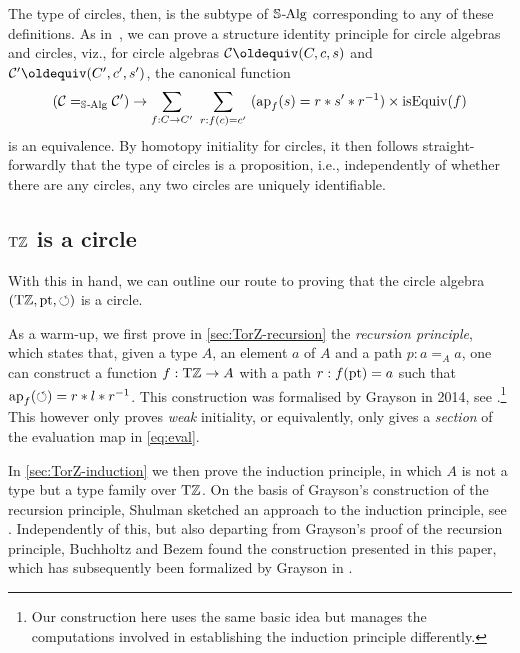 \documentclass[a4paper,12pt]{amsart}
\begin{document}
The type of circles, then, is the subtype of $\mathord{\mathbb{S}\textup{\kern.5pt-\kern-.5pt}\mathrm{Alg}}$
corresponding to any of these definitions.
As in~\cite[Sec.~9.8]{hottbook},
we can prove a structure identity principle for circle algebras and circles,
viz., for circle algebras $\mathcal C\jdeq(C,c,s)$ and
$\mathcal C'\jdeq(C',c',s')$, the canonical function
\[
  (\mathcal C =_{\mathord{\mathbb{S}\textup{\kern.5pt-\kern-.5pt}\mathrm{Alg}}} \mathcal C')
  \to
  \sum_{f : C \to C'}~\sum_{r:f(c)=c'}~(\mathop{{\mathrm{ap}}_{f}}(s)=r * s' * r^{-1})
  \times \mathrm{isEquiv}(f)
\]
is an equivalence.
By homotopy initiality for circles,
it then follows straight-forwardly that the type of circles
is a proposition, i.e.,
independently of whether there are any circles,
any two circles are uniquely identifiable.

\subsection{${\mathrm{T}\mathbb{Z}}$ is a circle}\label{sec:TorZ-circle}

With this in hand, we can outline our route to proving
that the circle algebra $({\mathrm{T}\mathbb{Z}},{\mathord{\mathrm{pt}}},{\circlearrowleft})$ is a circle.

As a warm-up, we first prove in \cref{sec:TorZ-recursion}
the \emph{recursion principle},
which states that, given a type $A$, an element $a$ of $A$ and a
path $p:a=_A a$, one can construct a function $f:{\mathrm{T}\mathbb{Z}}\to A$
with a path $r:f({\mathord{\mathrm{pt}}})=a$ such that $\mathop{{\mathrm{ap}}_{f}}({\circlearrowleft})=r * l * r^{-1}$.
This construction was formalised by Grayson
in 2014, see \cite[\href{https://github.com/UniMath/UniMath/blob/master/UniMath/SyntheticHomotopyTheory/Circle.v}{Circle.v}]{UniMath}.\footnote{Our construction here uses the
same basic idea but manages the computations involved in establishing the
induction principle differently.}
This however only proves \emph{weak} initiality, or equivalently,
only gives a \emph{section} of the evaluation map in \eqref{eq:eval}.

In \cref{sec:TorZ-induction} we then prove the induction principle,
in which $A$ is not a type but a type family over ${\mathrm{T}\mathbb{Z}}$.
On the basis of Grayson's construction of the recursion principle,
Shulman sketched an approach to the induction principle, see \cite{circleind-Mike}.
Independently of this, but also departing from Grayson's proof of the
recursion principle, Buchholtz and Bezem found the construction
presented in this paper, which has subsequently been formalized
by Grayson \cite[\href{https://github.com/UniMath/UniMath/blob/d5e570/UniMath/SyntheticHomotopyTheory/Circle2.v\#L268}{Circle2.v, line 268}]{UniMath} in \UniMath.
\end{document}
